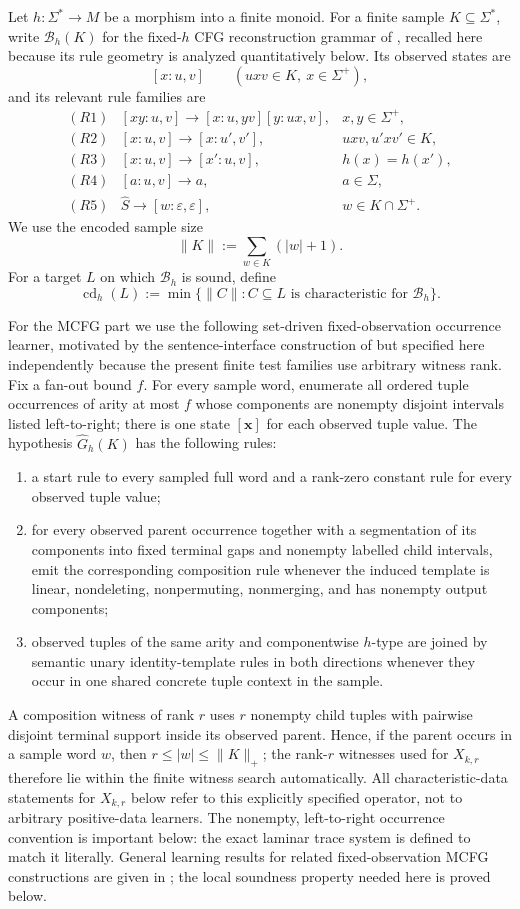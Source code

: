 \documentclass[11pt]{article}
\newcommand{\cd}{\operatorname{cd}}
\newcommand{\eps}{\varepsilon}
\newcommand{\B}{\mathcal B}
\begin{document}
Let $h:\Sigma^*\to M$ be a morphism into a finite monoid.  For a finite
sample $K\subseteq\Sigma^*$, write $\B_h(K)$ for the fixed-$h$ CFG
reconstruction grammar of \cite{KuriyamaCFG}, recalled here because its rule
geometry is analyzed quantitatively below.  Its observed states are
\[
 [x:u,v]\qquad(uxv\in K,\ x\in\Sigma^+),
\]
and its relevant rule families are
\[
\begin{array}{rll}
(R1)&[xy:u,v]\to[x:u,yv][y:ux,v],&x,y\in\Sigma^+,\\
(R2)&[x:u,v]\to[x:u',v'],&uxv,u'xv'\in K,\\
(R3)&[x:u,v]\to[x':u,v],&h(x)=h(x'),\\
(R4)&[a:u,v]\to a,&a\in\Sigma,\\
(R5)&\widehat S\to[w:\eps,\eps],&w\in K\cap\Sigma^+.
\end{array}
\]
We use the encoded sample size
\[
 \|K\|:=\sum_{w\in K}(|w|+1).
\]
For a target $L$ on which $\B_h$ is sound, define
\[
 \cd_h(L):=\min\{\|C\|: C\subseteq L\text{ is characteristic for }\B_h\}.
\]


For the MCFG part we use the following set-driven fixed-observation
occurrence learner, motivated by the sentence-interface construction of
\cite{KuriyamaMCFG} but specified here independently because the present
finite test families use arbitrary witness rank.  Fix a fan-out bound $f$.
For every sample word, enumerate all ordered tuple occurrences of arity at
most $f$ whose components are nonempty disjoint intervals listed left-to-right;
there is one state $[\mathbf x]$ for each observed tuple value.  The hypothesis
$\widehat G_h(K)$ has the following rules:
\begin{enumerate}[label=(M\arabic*)]
\item a start rule to every sampled full word and a rank-zero constant rule
      for every observed tuple value;
\item for every observed parent occurrence together with a segmentation of
      its components into fixed terminal gaps and nonempty labelled child
      intervals, emit the corresponding composition rule whenever the induced
      template is linear, nondeleting, nonpermuting, nonmerging, and has
      nonempty output components;
\item observed tuples of the same arity and componentwise $h$-type are joined
      by semantic unary identity-template rules in both directions whenever
      they occur in one shared concrete tuple context in the sample.
\end{enumerate}
A composition witness of rank $r$ uses $r$ nonempty child tuples with pairwise
disjoint terminal support inside its observed parent.  Hence, if the parent
occurs in a sample word $w$, then $r\le |w|\le\|K\|_+$; the rank-$r$ witnesses
used for $X_{k,r}$ therefore lie within the finite witness search automatically.
All characteristic-data statements for $X_{k,r}$ below refer to this explicitly
specified operator, not to arbitrary positive-data learners.  The nonempty,
left-to-right occurrence convention is important below: the exact laminar
trace system is defined to match it literally.  General learning results for
related fixed-observation MCFG constructions are given in
\cite{KuriyamaMCFG}; the local soundness property needed here is proved below.
\end{document}
